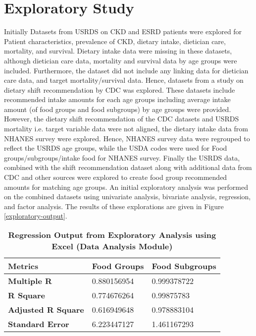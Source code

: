 \section{Exploratory Study}
Initially Datasets from USRDS on CKD and ESRD patients were explored for Patient characteristics, prevalence of CKD, dietary intake, dietician care, mortality, and survival. Dietary intake data were missing in these datasets, although dietician care data, mortality and survival data by age groups were included. Furthermore, the dataset did not include any linking data for dietician care data, and target mortality/survival data. Hence, datasets from a study on dietary shift recommendation by CDC was explored. These datasets include recommended intake amounts for each age groups including average intake amount (of food groups and food subgroups) by age groups were provided. However, the dietary shift recommendation of the CDC datasets and USRDS mortality i.e. target variable data were not aligned, the dietary intake data from NHANES survey were explored. Hence, NHANES survey data were regrouped to reflect the USRDS age groups, while the USDA codes were used for Food groups/subgroups/intake food for NHANES survey. Finally the USRDS data, combined with the shift recommendation dataset along with additional data from CDC and other sources were explored to create food group recommended amounts for matching age groups. An initial exploratory analysis was performed on the combined datasets using univariate analysis, bivariate analysis, regression, and factor analysis. The results of these explorations are given in Figure  \ref{exploratory-output}.

\begin{table}[!htb]
\caption{\textbf{Regression Output from Exploratory Analysis using Excel (Data Analysis Module)}}
\begin{tabular}{  | p{2cm} | p{2 cm}  | p{2 cm} | }
\hline
   \textbf{Metrics} & \textbf{Food Groups} & \textbf{Food Subgroups} \\
\hline   
   \textbf{Multiple R}	& 0.880156954 & 0.999378722\\
\hline
\textbf{R Square}	& 0.774676264 & 0.99875783\\
\hline
\textbf{Adjusted R Square} &	0.616949648 &  0.978883104\\ 
\hline
\textbf{Standard Error}	& 6.223447127 & 1.461167293\\
\hline
\end{tabular}
\end{table}

